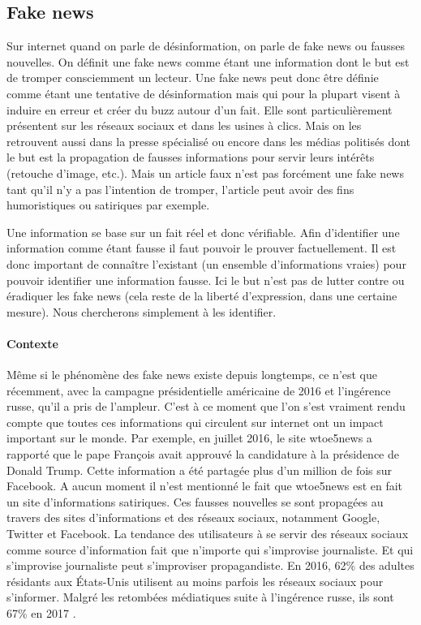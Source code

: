 \subsection{Fake news}

Sur internet quand on parle de désinformation, on parle de fake news ou fausses nouvelles. On définit une fake news comme étant une information dont le but est de tromper consciemment un lecteur. Une fake news peut donc être définie comme étant une tentative de désinformation mais qui pour la plupart visent à induire en erreur et créer du buzz autour d'un fait. Elle sont particulièrement présentent sur les réseaux sociaux et dans les usines à clics. Mais on les retrouvent aussi dans la presse spécialisé ou encore dans les médias politisés dont le but est la propagation de fausses informations pour servir leurs intérêts (retouche d'image, etc.).  Mais un article faux n'est pas forcément une fake news tant qu'il n'y a pas l'intention de tromper, l'article peut avoir des fins humoristiques ou satiriques par exemple.

Une information se base sur un fait réel et donc vérifiable. Afin d'identifier une information comme étant fausse il faut pouvoir le prouver factuellement. Il est donc important de connaître l'existant (un ensemble d'informations vraies) pour pouvoir identifier une information fausse. Ici le but n'est pas de lutter contre ou éradiquer les fake news (cela reste de la liberté d'expression, dans une certaine mesure). Nous chercherons simplement à les identifier.

\paragraph{Contexte}

Même si le phénomène des fake news existe depuis longtemps, ce n'est que récemment, avec la campagne présidentielle américaine de 2016 et l'ingérence russe, qu'il a pris de l'ampleur. C'est à ce moment que l'on s'est vraiment rendu compte que toutes ces informations qui circulent sur internet ont un impact important sur le monde. Par exemple, en juillet 2016, le site wtoe5news a rapporté que le pape François avait approuvé la candidature à la présidence de Donald Trump. Cette information a été partagée plus d'un million de fois sur Facebook. A aucun moment il n'est mentionné le fait que wtoe5news est en fait un site d'informations satiriques. Ces fausses nouvelles se sont propagées au travers des sites d'informations et des réseaux sociaux, notamment Google, Twitter et Facebook. La tendance des utilisateurs à se servir des réseaux sociaux comme source d'information fait que n'importe qui s'improvise journaliste. Et qui s'improvise journaliste peut s'improviser propagandiste. En 2016, 62\% des adultes résidants aux États-Unis utilisent au moins parfois les réseaux sociaux pour s'informer. Malgré les retombées médiatiques suite à l'ingérence russe, ils sont 67\% en 2017 \cite{news_across_platforms_2017}.

